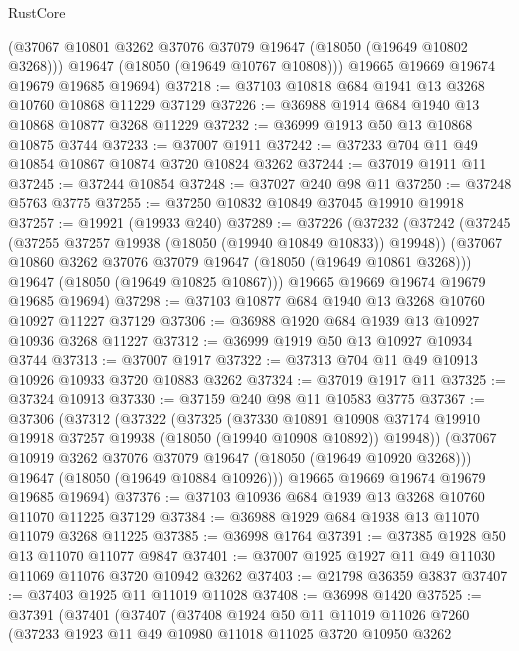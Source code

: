 \begin{lexlean}{RustCore}
\begin{coremodule}
        (@37067 @10801 @3262 @37076 @37079 @19647 (@18050 (@19649 @10802 @3268)))
        @19647
        (@18050 (@19649 @10767 @10808)))
      @19665
      @19669
      @19674
      @19679
      @19685
      @19694)
@37218 := @37103 @10818 @684 @1941 @13 @3268 @10760 @10868 @11229 @37129
@37226 := @36988 @1914 @684 @1940 @13 @10868 @10877 @3268 @11229
@37232 := @36999 @1913 @50 @13 @10868 @10875 @3744
@37233 := @37007 @1911
@37242 := @37233 @704 @11 @49 @10854 @10867 @10874 @3720 @10824 @3262
@37244 := @37019 @1911 @11
@37245 := @37244 @10854
@37248 := @37027 @240 @98 @11
@37250 := @37248 @5763 @3775
@37255 := @37250 @10832 @10849 @37045 @19910 @19918
@37257 := @19921 (@19933 @240)
@37289 := @37226
    (@37232
      (@37242
        (@37245 (@37255 @37257 @19938 (@18050 (@19940 @10849 @10833)) @19948))
        (@37067 @10860 @3262 @37076 @37079 @19647 (@18050 (@19649 @10861 @3268)))
        @19647
        (@18050 (@19649 @10825 @10867)))
      @19665
      @19669
      @19674
      @19679
      @19685
      @19694)
@37298 := @37103 @10877 @684 @1940 @13 @3268 @10760 @10927 @11227 @37129
@37306 := @36988 @1920 @684 @1939 @13 @10927 @10936 @3268 @11227
@37312 := @36999 @1919 @50 @13 @10927 @10934 @3744
@37313 := @37007 @1917
@37322 := @37313 @704 @11 @49 @10913 @10926 @10933 @3720 @10883 @3262
@37324 := @37019 @1917 @11
@37325 := @37324 @10913
@37330 := @37159 @240 @98 @11 @10583 @3775
@37367 := @37306
    (@37312
      (@37322
        (@37325
          (@37330
            @10891
            @10908
            @37174
            @19910
            @19918
            @37257
            @19938
            (@18050 (@19940 @10908 @10892))
            @19948))
        (@37067 @10919 @3262 @37076 @37079 @19647 (@18050 (@19649 @10920 @3268)))
        @19647
        (@18050 (@19649 @10884 @10926)))
      @19665
      @19669
      @19674
      @19679
      @19685
      @19694)
@37376 := @37103 @10936 @684 @1939 @13 @3268 @10760 @11070 @11225 @37129
@37384 := @36988 @1929 @684 @1938 @13 @11070 @11079 @3268 @11225
@37385 := @36998 @1764
@37391 := @37385 @1928 @50 @13 @11070 @11077 @9847
@37401 := @37007 @1925 @1927 @11 @49 @11030 @11069 @11076 @3720 @10942 @3262
@37403 := @21798 @36359 @3837
@37407 := @37403 @1925 @11 @11019 @11028
@37408 := @36998 @1420
@37525 := @37391
    (@37401
      (@37407
        (@37408
          @1924
          @50
          @11
          @11019
          @11026
          @7260
          (@37233
            @1923
            @11
            @49
            @10980
            @11018
            @11025
            @3720
            @10950
            @3262

\end{coremodule}
\end{lexlean}
